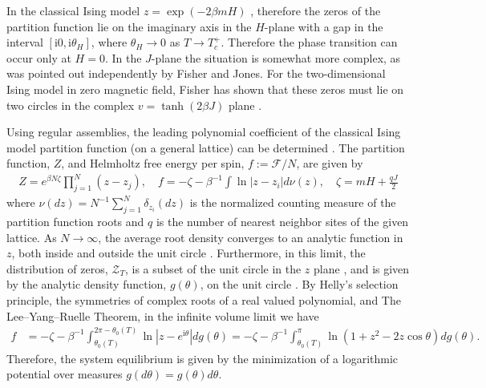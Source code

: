 \documentclass[english,12pt]{ttuthes}
\newcommand{\Fc}{\mathcal{F}}
\newcommand{\I}{\mathrm{i}}
\begin{document}
In the classical Ising model $z=\exp(-2\beta mH)$ \cite{Baker-1990},
therefore the zeros of the partition function lie on the imaginary
axis in the $H$-plane with a gap in the interval $[\I0,\I\theta_H]$, where
$\theta_H\to0$ as $T\to T_c^+$. Therefore the phase transition can occur only
at $H=0$. In the $J$-plane the situation is somewhat more complex, as
was pointed out independently by Fisher and Jones. For the
two-dimensional Ising model in zero magnetic field, Fisher has shown
that these zeros must lie on two circles in the complex $v =
\tanh(2\beta J)$ plane \cite{Golden:JMP-5627}.    

Using regular assemblies, the leading polynomial coefficient of the
classical Ising model partition function (on a general lattice) can be
determined \cite{Baker-1990}. The partition function, $Z$, and Helmholtz
free energy per spin, $f:=\Fc/N$, are given by
\cite{Baker-1990}       
%
\begin{align}
  Z =e^{\beta N\zeta}\prod_{j=1}^{N}(z-z_j),\quad
  f=-\zeta -\beta^{-1} \int\ln|z-z_i|d\nu(z),\quad
      \zeta=mH+\frac{qJ}{2}
\end{align}
%
where $\nu(dz)=N^{-1}\sum_{j=1}^{N}\delta_{z_i}(dz)$ is the normalized counting
measure of the partition function roots and $q$ is the number of
nearest neighbor sites of the given lattice. As $N\to\infty$, the average
root density converges to an analytic function in $z$, both inside and
outside the unit circle \cite{Yang:PR:404,Ruelle-1969}. Furthermore,
in this limit, the distribution of zeros, $\mathcal{Z}_T$, is a subset
of the unit circle in the $z$ plane \cite{Lee:PR:411,Wintner:MP:1},
and is given by the analytic density function, $g(\theta)$, on the unit
circle \cite{Baker-1990}. By Helly's selection principle, the
symmetries of complex roots of a real valued polynomial, and The
Lee--Yang--Ruelle Theorem, in the infinite volume limit we have
\cite{Baker-1990}    
%
\begin{align}\label{eq:inf_vol_Free_Energy}
   f &=-\zeta - \beta^{-1} \int_{\theta_0(T)}^{2\pi - \theta_0(T)} \ln|z-e^{\I \theta}| dg(\theta)
  =  -\zeta -\beta^{-1} \int_{\theta_{0}(T)}^{\pi} \ln (1 + z^2 -2z \cos\theta) dg(\theta).
\end{align}
%
Therefore, the system equilibrium is given by the minimization of a
logarithmic potential over measures $g(d\theta)=g(\theta)d\theta$.
\end{document}
